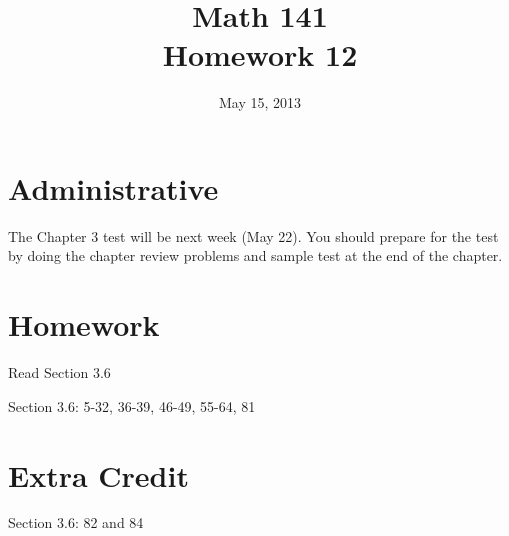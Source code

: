 \documentclass{exam}
\date{May 15, 2013}
\author{}
\title{Math 141 \\ Homework 12}
\begin{document}
\maketitle

\section{Administrative}

The Chapter 3 test will be next week (May 22).  You should prepare for the test by doing the chapter review problems and
sample test at the end of the chapter.  

\section{Homework}

\begin{itemize*}
  \item Read Section 3.6 
  \item Section 3.6: 5-32, 36-39, 46-49, 55-64, 81
\end{itemize*}

\section{Extra Credit}
Section 3.6: 82 and 84

\ifprintanswers
  \pagebreak
\end{document}
